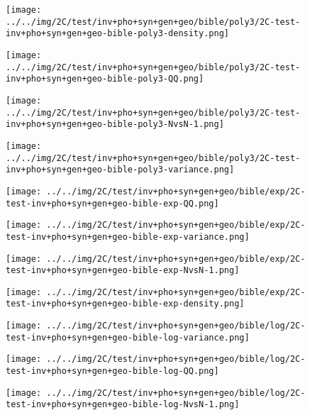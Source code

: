 \begin{figure}[H]
\centering	\texttt{[image: ../../img/2C/test/inv+pho+syn+gen+geo/bible/poly3/2C-test-inv+pho+syn+gen+geo-bible-poly3-density.png]}
\end{figure}
\begin{figure}[H]
\centering	\texttt{[image: ../../img/2C/test/inv+pho+syn+gen+geo/bible/poly3/2C-test-inv+pho+syn+gen+geo-bible-poly3-QQ.png]}
\end{figure}
\begin{figure}[H]
\centering	\texttt{[image: ../../img/2C/test/inv+pho+syn+gen+geo/bible/poly3/2C-test-inv+pho+syn+gen+geo-bible-poly3-NvsN-1.png]}
\end{figure}
\begin{figure}[H]
\centering	\texttt{[image: ../../img/2C/test/inv+pho+syn+gen+geo/bible/poly3/2C-test-inv+pho+syn+gen+geo-bible-poly3-variance.png]}
\end{figure}
\begin{figure}[H]
\centering	\texttt{[image: ../../img/2C/test/inv+pho+syn+gen+geo/bible/exp/2C-test-inv+pho+syn+gen+geo-bible-exp-QQ.png]}
\end{figure}
\begin{figure}[H]
\centering	\texttt{[image: ../../img/2C/test/inv+pho+syn+gen+geo/bible/exp/2C-test-inv+pho+syn+gen+geo-bible-exp-variance.png]}
\end{figure}
\begin{figure}[H]
\centering	\texttt{[image: ../../img/2C/test/inv+pho+syn+gen+geo/bible/exp/2C-test-inv+pho+syn+gen+geo-bible-exp-NvsN-1.png]}
\end{figure}
\begin{figure}[H]
\centering	\texttt{[image: ../../img/2C/test/inv+pho+syn+gen+geo/bible/exp/2C-test-inv+pho+syn+gen+geo-bible-exp-density.png]}
\end{figure}
\begin{figure}[H]
\centering	\texttt{[image: ../../img/2C/test/inv+pho+syn+gen+geo/bible/log/2C-test-inv+pho+syn+gen+geo-bible-log-variance.png]}
\end{figure}
\begin{figure}[H]
\centering	\texttt{[image: ../../img/2C/test/inv+pho+syn+gen+geo/bible/log/2C-test-inv+pho+syn+gen+geo-bible-log-QQ.png]}
\end{figure}
\begin{figure}[H]
\centering	\texttt{[image: ../../img/2C/test/inv+pho+syn+gen+geo/bible/log/2C-test-inv+pho+syn+gen+geo-bible-log-NvsN-1.png]}
\end{figure}
